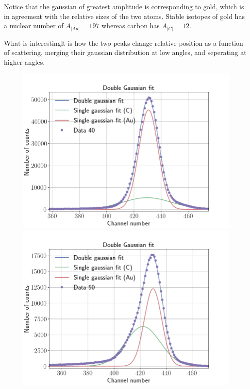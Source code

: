 Notice that the gaussian of greatest amplitude is corresponding to gold, which
is in agreement with the relative sizes of the two atoms. Stable isotopes of
gold has a nuclear number of $A_|Au| = 197$ whereas carbon has $A_|C| = 12$.

What is interestinglt is how the two peaks change relative position as a
function of scattering, merging their gaussian distribution at low angles, and
seperating at higher angles. 

\begin{figure}
\centering
\includegraphics[width=0.99\columnwidth]{Data_40}
\includegraphics[width=0.99\columnwidth]{Data_50}

\end{figure}
